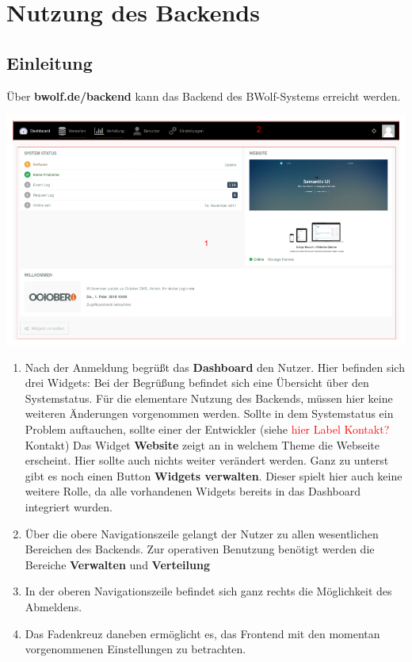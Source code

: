 \chapter{Nutzung des Backends}
\label{chapter:use}
  
  \section{Einleitung}
  \label{section:backend_introduction}
  
  Über \textbf{bwolf.de/backend} kann das Backend des BWolf-Systems erreicht werden.
  
  \includegraphics[scale=0.3]{backend/img/dashboard.png}
  \begin{enumerate}
   \item Nach der Anmeldung begrüßt das \textbf{Dashboard} den Nutzer. 
	  Hier befinden sich drei Widgets:\newline
	  Bei der Begrüßung befindet sich eine Übersicht über den Systemstatus.\newline
	  Für die elementare Nutzung des Backends, müssen hier keine weiteren Änderungen vorgenommen werden.\newline
	  Sollte in dem Systemstatus ein Problem auftauchen, sollte einer der Entwickler (siehe \textcolor{red}{hier Label Kontakt?}Kontakt)\newline
	  Das Widget \textbf{Website} zeigt an in welchem Theme die Webseite erscheint. Hier sollte auch nichts weiter verändert werden.
	  Ganz zu unterst gibt es noch einen Button \textbf{Widgets verwalten}. 
	  Dieser spielt hier auch keine weitere Rolle, da alle vorhandenen Widgets bereits in das Dashboard integriert wurden.
   \item Über die obere Navigationszeile gelangt der Nutzer zu allen wesentlichen Bereichen des Backends.
	 Zur operativen Benutzung benötigt werden die Bereiche \textbf{Verwalten} und \textbf{Verteilung}
   \item In der oberen Navigationszeile befindet sich ganz rechts die Möglichkeit des Abmeldens.
   \item Das Fadenkreuz daneben ermöglicht es, das Frontend mit den momentan vorgenommenen Einstellungen zu betrachten.
  \end{enumerate}

